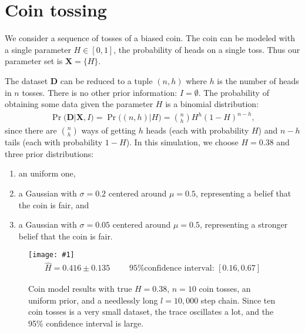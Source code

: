 \documentclass{article}
\renewcommand{\vec}{\mathbf}
\theoremstyle{definition}
\newtheorem*{thm}{Theorem}
\renewcommand{\sp}[1]{\;\;\;\text{ #1 }\;\;\;}
\newcommand{\plop}[3]{
    \begin{figure}\centering
        \texttt{[image: \#1]}
        {#2}\vspace{-20pt}
        \caption{\label{#1}#3}
    \end{figure}
}
\begin{document}

\section{Coin tossing}

We consider a sequence of tosses of a biased coin. The coin can be
modeled with a single parameter $H \in [0, 1]$, the probability of
heads on a single toss. Thus our parameter set is $\vec X = \{ H \}$.

The dataset $\vec D$ can be reduced to a tuple $(n, h)$ where $h$
is the number of heads in $n$ tosses. There is no other
prior information: $I = \emptyset$. The probability of obtaining
some data given the parameter $H$ is a binomial distribution:
\begin{align*}
\Pr(\vec D | \vec X, I) = \Pr\Big( (n, h) | H \Big)
= {n \choose h} H^h (1 - H)^{n - h},
\end{align*}
since there are ${n \choose h}$ ways of getting $h$ heads (each
with probability $H$) and $n - h$ tails (each with probability
$1 - H$).
In this simulation, we choose $H = 0.38$ and three prior distributions:
\begin{enumerate}
\item an uniform one,
\item a Gaussian with $\sigma = 0.2$ centered around $\mu = 0.5$,
representing a belief that the coin is fair, and
\item a Gaussian
with $\sigma = 0.05$ centered around $\mu = 0.5$, representing a stronger
belief that the coin is fair.
\end{enumerate}

\plop{pheads_10_10k_u.png}
{\begin{align*}
\hat H = 0.416 \pm 0.135
\sp{}
\text{95\% confidence interval: }
[0.16, 0.67]
\end{align*}}
{
Coin model results with true $H = 0.38$, $n = 10$ coin tosses, an uniform
prior, and a
needlessly long $l = 10,000$ step chain. Since ten coin tosses is a very
small dataset, the trace oscillates a lot, and the 95\% confidence interval
is large.
}
\end{document}
